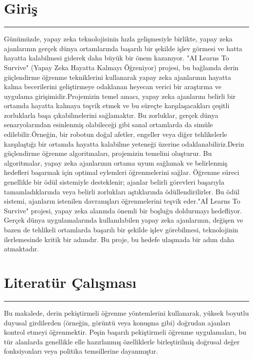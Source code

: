 \documentclass{article}
\begin{document}
\section{Giriş}
\rule{\textwidth}{0.5pt}
Günümüzde, yapay zeka teknolojisinin hızla gelişmesiyle birlikte, yapay zeka ajanlarının gerçek dünya ortamlarında başarılı bir şekilde işlev görmesi ve hatta hayatta kalabilmesi giderek daha büyük bir önem kazanıyor. "AI Learns To Survive" (Yapay Zeka Hayatta Kalmayı Öğreniyor) projesi, bu bağlamda derin güçlendirme öğrenme tekniklerini kullanarak yapay zeka ajanlarının hayatta kalma becerilerini geliştirmeye odaklanan heyecan verici bir araştırma ve uygulama girişimidir.Projemizin temel amacı, yapay zeka ajanlarını belirli bir ortamda hayatta kalmaya teşvik etmek ve bu süreçte karşılaşacakları çeşitli zorluklarla başa çıkabilmelerini sağlamaktır. Bu zorluklar, gerçek dünya senaryolarından esinlenmiş olabileceği gibi sanal ortamlarda da simüle edilebilir.Örneğin, bir robotun doğal afetler, engeller veya diğer tehlikelerle karşılaştığı bir ortamda hayatta kalabilme yeteneği üzerine odaklanabiliriz.Derin güçlendirme öğrenme algoritmaları, projemizin temelini oluşturur. Bu algoritmalar, yapay zeka ajanlarının ortama uyum sağlamak ve belirlenmiş hedefleri başarmak için optimal eylemleri öğrenmelerini sağlar. Öğrenme süreci genellikle bir ödül sistemiyle desteklenir; ajanlar belirli görevleri başarıyla tamamladıklarında veya belirli zorlukları aştıklarında ödüllendirilirler. Bu ödül sistemi, ajanların istenilen davranışları öğrenmelerini teşvik eder."Aİ Learns To Survive" projesi, yapay zeka alanında önemli bir boşluğu doldurmayı hedefliyor. Gerçek dünya uygulamalarında kullanılabilen yapay zeka ajanlarının, değişen ve bazen de tehlikeli ortamlarda başarılı bir şekilde işlev görebilmesi, teknolojinin ilerlemesinde kritik bir adımdır. Bu proje, bu hedefe ulaşmada bir adım daha atmaktadır.
  \newpage
  \section{Literatür Çalışması}
\rule{\textwidth}{0.5pt}
Bu makalede, derin pekiştirmeli öğrenme yöntemlerini kullanarak, yüksek boyutlu duyusal girdilerden (örneğin, görüntü veya konuşma gibi) doğrudan ajanları kontrol etmeyi öğrenmektir. Peşin başarılı pekiştirmeli öğrenme uygulamaları, bu tür alanlarda genellikle elle hazırlanmış özelliklerle birleştirilmiş doğrusal değer fonksiyonları veya politika temsillerine dayanmıştır\cite{mnih2013playing}.\\[15pt]
\end{document}
